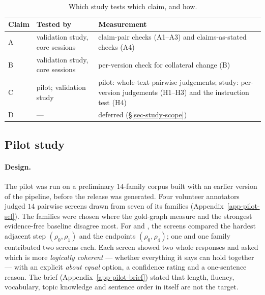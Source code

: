 \begin{table}[t]
\centering\small
\caption{Which study tests which claim, and how.}
\label{tab:claims-map}
\begin{tabular}{@{}lp{3.2cm}p{7.2cm}@{}}
\toprule
Claim & Tested by & Measurement \\
\midrule
A & validation study, core sessions & claim-pair checks (A1--A3) and claims-as-stated checks (A4) \\
B & validation study, core sessions & per-version check for collateral change (B) \\
C & pilot; validation study & pilot: whole-text pairwise judgements; study: per-version judgements (H1--H3) and the
  instruction test (H4) \\
D & --- & deferred (\S\ref{sec-study-scope}) \\
\bottomrule
\end{tabular}
\end{table}

\subsection{Pilot study}
\label{sec-pilot}

\paragraph{Design.} The pilot was run on a preliminary $14$-family corpus built with an earlier version of the
pipeline, before the release was generated. Four volunteer annotators judged $14$ pairwise screens drawn from seven
of its families (Appendix~\ref{app-pilot-sel}). The families were chosen where the gold-graph measure and the
strongest evidence-free baseline disagree most. For  and , the screens compared
the hardest adjacent step $(\rho_0,\rho_1)$ and the endpoints $(\rho_0,\rho_4)$; one  and one
 family contributed two screens each. Each screen showed two whole responses and asked which is
more \emph{logically coherent} --- whether everything it says can hold together --- with an explicit \emph{about
equal} option, a confidence rating and a one-sentence reason. The brief (Appendix~\ref{app-pilot-brief}) stated
that length, fluency, vocabulary, topic knowledge and sentence order in itself are not the target.

